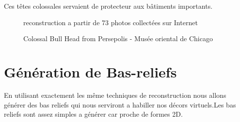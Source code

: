 \documentclass[a4paper,10pt,french]{sphinxhowto}
\begin{document}
Ces têtes colossales servaient de protecteur aux bâtiments importants.
\begin{figure}[htbp]
\centering
\capstart

\caption{Colossal Bull Head from Persepolis - Musée oriental de Chicago}{\small 
reconstruction a partir de 73 photos collectées sur Internet
}\end{figure}


\section{Génération de Bas-reliefs}
\label{basrelief::doc}\label{basrelief:generation-de-bas-reliefs}
En utilisant exactement les même techniques de reconstruction nous allons générer des bas reliefs qui nous serviront a habiller nos décors virtuels.Les bas reliefs sont assez simples a générer car proche de formes 2D.
\end{document}
